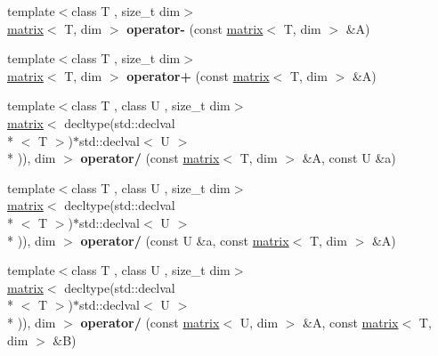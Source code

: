 \begin{DoxyCompactItemize}
\item 
\hypertarget{namespacekeycpp_ac6b0a62473683f833921698fbf6f5ed2}{{\footnotesize template$<$class T , size\-\_\-t dim$>$ }\\\hyperlink{classkeycpp_1_1matrix}{matrix}$<$ T, dim $>$ {\bfseries operator-\/} (const \hyperlink{classkeycpp_1_1matrix}{matrix}$<$ T, dim $>$ \&A)}\label{namespacekeycpp_ac6b0a62473683f833921698fbf6f5ed2}

\item 
\hypertarget{namespacekeycpp_aee7f8968a3e1ede6414762c44a8868af}{{\footnotesize template$<$class T , size\-\_\-t dim$>$ }\\\hyperlink{classkeycpp_1_1matrix}{matrix}$<$ T, dim $>$ {\bfseries operator+} (const \hyperlink{classkeycpp_1_1matrix}{matrix}$<$ T, dim $>$ \&A)}\label{namespacekeycpp_aee7f8968a3e1ede6414762c44a8868af}

\item 
\hypertarget{namespacekeycpp_a4bb5672c8d698032875766c42cd52547}{{\footnotesize template$<$class T , class U , size\-\_\-t dim$>$ }\\\hyperlink{classkeycpp_1_1matrix}{matrix}$<$ decltype(std\-::declval\\*
$<$ T $>$)$\ast$std\-::declval$<$ U $>$\\*
)), dim $>$ {\bfseries operator/} (const \hyperlink{classkeycpp_1_1matrix}{matrix}$<$ T, dim $>$ \&A, const U \&a)}\label{namespacekeycpp_a4bb5672c8d698032875766c42cd52547}

\item 
\hypertarget{namespacekeycpp_a88f5fa68e3f7fb39690f9e5c93bafc5c}{{\footnotesize template$<$class T , class U , size\-\_\-t dim$>$ }\\\hyperlink{classkeycpp_1_1matrix}{matrix}$<$ decltype(std\-::declval\\*
$<$ T $>$)$\ast$std\-::declval$<$ U $>$\\*
)), dim $>$ {\bfseries operator/} (const U \&a, const \hyperlink{classkeycpp_1_1matrix}{matrix}$<$ T, dim $>$ \&A)}\label{namespacekeycpp_a88f5fa68e3f7fb39690f9e5c93bafc5c}

\item 
\hypertarget{namespacekeycpp_adfc07ecaeccc3d1accc773feb559dabc}{{\footnotesize template$<$class T , class U , size\-\_\-t dim$>$ }\\\hyperlink{classkeycpp_1_1matrix}{matrix}$<$ decltype(std\-::declval\\*
$<$ T $>$)$\ast$std\-::declval$<$ U $>$\\*
)), dim $>$ {\bfseries operator/} (const \hyperlink{classkeycpp_1_1matrix}{matrix}$<$ U, dim $>$ \&A, const \hyperlink{classkeycpp_1_1matrix}{matrix}$<$ T, dim $>$ \&B)}\label{namespacekeycpp_adfc07ecaeccc3d1accc773feb559dabc}


\end{DoxyCompactItemize}
